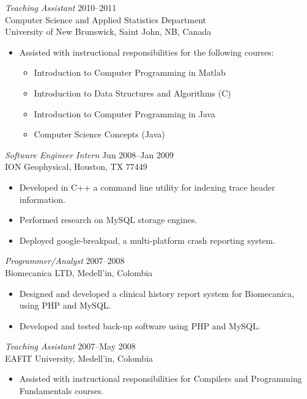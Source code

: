 \documentclass[line,margin]{res}
\begin{document}
\begin{resume}
{\sl Teaching Assistant} \hfill 2010--2011\\
Computer Science and Applied Statistics Department\\
University of New Brunswick, Saint John, NB, Canada
\begin{itemize} %
    \item Assisted with instructional responsibilities for the following courses:
    \begin{itemize} \itemsep -2pt
        \item Introduction to Computer Programming in Matlab
        \item Introduction to Data Structures and Algorithms (C)
        \item Introduction to Computer Programming in Java
        \item Computer Science Concepts (Java)
    \end{itemize}
\end{itemize}

{\sl Software Engineer Intern} \hfill Jun 2008--Jan 2009\\
ION Geophysical, Houston, TX 77449
\begin{itemize} \itemsep -2pt
    \item Developed in C++ a command line utility for indexing trace header information.
    \item Performed research on MySQL storage engines.
    \item Deployed google-breakpad, a multi-platform crash reporting system.
\end{itemize}

{\sl Programmer/Analyst} \hfill 2007--2008\\
Biomecanica LTD, Medell\a'in, Colombia
\begin{itemize} \itemsep -2pt
    \item Designed and developed a clinical history report system for Biomecanica, using PHP and MySQL.
    \item Developed and tested back-up software using PHP and MySQL.
\end{itemize}

{\sl Teaching Assistant} \hfill 2007--May 2008\\
EAFIT University, Medell\a'in, Colombia
\begin{itemize} \itemsep -2pt
    \item  Assisted with instructional responsibilities for Compilers and Programming Fundamentals courses.
\end{itemize}


\end{resume}
\end{document}
